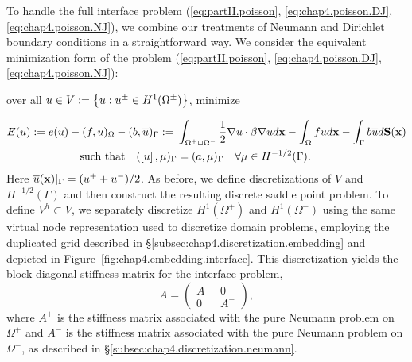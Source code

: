 To handle the full interface problem (\ref{eq:partII.poisson}, \ref{eq:chap4.poisson.DJ}, \ref{eq:chap4.poisson.NJ}), we combine our treatments of Neumann and Dirichlet boundary conditions in a straightforward way. We consider the equivalent minimization form of the problem (\ref{eq:partII.poisson}, \ref{eq:chap4.poisson.DJ}, \ref{eq:chap4.poisson.NJ}):
\begin{center}
over all $u \in V := \left\lbrace  u : u^\pm \in H^1(\Omega^{\pm})  \right\rbrace$, minimize
\end{center}
\begin{align}
E(u) := e(u) - (f,u)_{\Omega} - (b, \overline{u})_{\Gamma} := {} & \int_{\Omega^+ \sqcup \Omega^-} \frac{1}{2} \nabla u \cdot \beta \nabla u d\mathbf{x} - \int_{\Omega} f u d\mathbf{x} - \int_{\Gamma} b \overline{u} d\mathbf{S}(\mathbf{x}) \label{eq:chap4.interface.energy.continuous} \\ 
\text{such that} \quad (\left[ u \right], \mu)_{\Gamma} & = (a,\mu)_{\Gamma} \quad \forall \mu \in H^{-1/2}(\Gamma). \label{eq:interface.constraint.continuous}
\end{align}
Here $\overline{u}(\mathbf{x}) \rvert_{\Gamma} = (u^+ + u^-) / 2$. As before, we define discretizations of $V$ and $H^{-1/2}(\Gamma)$ and then construct the resulting discrete saddle point problem. To define $V^h \subset V$, we separately discretize $H^1(\Omega^+)$ and $H^1(\Omega^-)$ using the same virtual node representation used to discretize domain problems, employing the duplicated grid described in \S\ref{subsec:chap4.discretization.embedding} and depicted in Figure~\ref{fig:chap4.embedding.interface}. This discretization yields the block diagonal stiffness matrix for the interface problem,
\begin{equation} \label{eq:chap4.interface.stiffnessmatrix}
A = \begin{pmatrix} A^+ & 0 \\ 0 & A^- \end{pmatrix},
\end{equation}
where $A^+$ is the stiffness matrix associated with the pure Neumann problem on $\Omega^+$ and $A^-$ is the stiffness matrix associated with the pure Neumann problem on $\Omega^-$, as described in \S\ref{subsec:chap4.discretization.neumann}.


